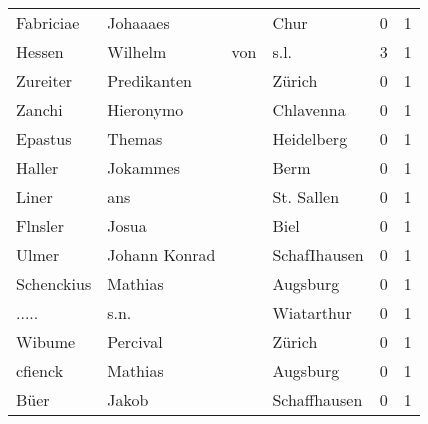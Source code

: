 \documentclass[10pt,a4paper,landscape]{article}
\begin{document}
\begin{longtable}{llllrr}
                Fabriciae &                           Johaaaes &             &                                        Chur &          0 &         1 \\
                   Hessen &                            Wilhelm &         von &                                        s.l. &          3 &         1 \\
                 Zureiter &                        Predikanten &             &                                      Zürich &          0 &         1 \\
                   Zanchi &                          Hieronymo &             &                                   Chlavenna &          0 &         1 \\
                  Epastus &                             Themas &             &                                  Heidelberg &          0 &         1 \\
                   Haller &                           Jokammes &             &                                        Berm &          0 &         1 \\
                    Liner &                                ans &             &                                  St. Sallen &          0 &         1 \\
                  Flnsler &                              Josua &             &                                        Biel &          0 &         1 \\
                    Ulmer &                      Johann Konrad &             &                                SchafIhausen &          0 &         1 \\
               Schenckius &                            Mathias &             &                                    Augsburg &          0 &         1 \\
                    ..... &                               s.n. &             &                                  Wiatarthur &          0 &         1 \\
                   Wibume &                           Percival &             &                                      Zürich &          0 &         1 \\
                  cfienck &                            Mathias &             &                                    Augsburg &          0 &         1 \\
                     Büer &                              Jakob &             &                                Schaffhausen &          0 &         1 \\

\end{longtable}
\end{document}
